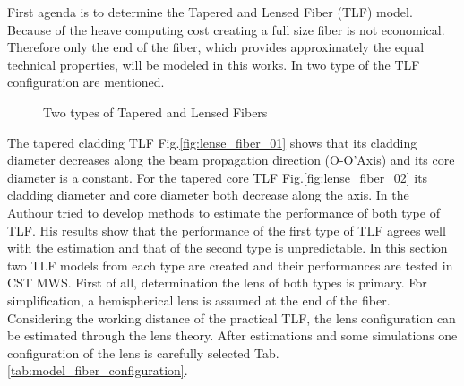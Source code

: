 
First agenda is to determine the Tapered and Lensed Fiber (TLF) model. Because of the heave computing cost creating a full size fiber is not economical. Therefore only the end of the fiber, which provides approximately the equal technical properties, will be modeled in this works.  In \cite{TLF_analysis,TLF_mode_transforming} two type of the TLF configuration are mentioned. 


\begin{figure}[!ht]
\centering
{}
\hfill
{}
\label{fig:two_TLF}
\caption{Two types of Tapered and Lensed Fibers}
\end{figure}

The tapered cladding TLF Fig.\quad\ref{fig:lense_fiber_01} shows that its cladding diameter decreases along the beam propagation direction (O-O'Axis) and its core diameter is a constant. For the tapered core TLF Fig.\quad\ref{fig:lense_fiber_02} its cladding diameter and core diameter both decrease along the axis. In \cite{TLF_mode_transforming} the Authour tried to develop methods to estimate the performance of both type of TLF. His results show that the performance of the first type of TLF agrees well with the estimation and that of the second type is unpredictable. In this section two TLF models from each type are created and their performances are tested in CST MWS.  
First of all, determination the lens of both types is primary. For simplification, a hemispherical lens is assumed at the end of the fiber. Considering the working distance of the practical TLF, the lens configuration can be estimated through the lens theory. After estimations and some simulations one configuration of the lens is carefully selected Tab.\quad\ref{tab:model_fiber_configuration}.   

